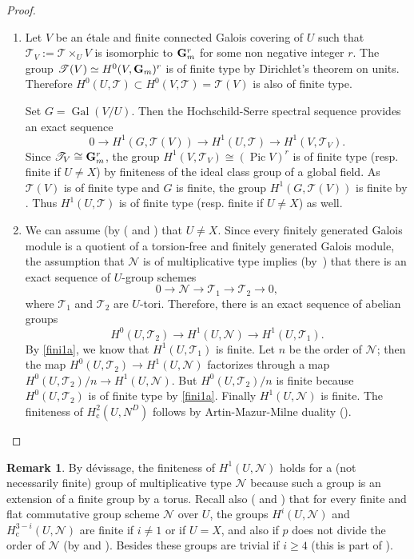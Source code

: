 \documentclass[10pt,a4paper]{amsart}
\newcommand{\resp}{resp.\xspace}
\newcommand{\skpt}{\smallskip}
\let\mathcal\mathscr
\newenvironment{enumeratea}
{\bgroup\def\theenumi{\alph{enumi}}\begin{enumerate}}
{\end{enumerate}\egroup}
\newcommand{\rc}{\mathrm{c}}
\theoremstyle{plain}
\theoremstyle{definition}
\newtheorem{rema}[theo]{Remark}
\DeclareMathOperator \pic {Pic}
\DeclareMathOperator \gal {Gal}
\newcommand\cN {\mathcal{N}}
\newcommand \cT {\mathcal{T}}
\begin{document}
\skpt\begin{proof}
\begin{enumeratea}
\item
Let $V$ be an étale and finite connected
Galois covering of $U$ such that $\cT_V:=\cT \times_U V$
is isomorphic to $\mathbf{G}_m^r$ for some non negative integer $r$.
The group $\cT(V) \simeq
H^0(V,\G)^r$ is of finite type by Dirichlet's theorem on units. Therefore
$H^0(U,\cT) \subset H^0(V,\cT)=\cT(V)$
is also of finite type.

Set $G=\gal(V/U)$. Then the Hochschild-Serre spectral sequence provides an
exact sequence
\[
0 \to H^1(G,\cT(V)) \to H^1(U,\cT)
\to H^1(V,\cT_V).
\]
Since $\cT_V \cong \G^r$, the group
$H^1(V,\cT_V) \cong (\pic V)^r$ is of finite type
(\resp finite if $U \neq X$) by finiteness of the ideal class group
of a global field.
As $\cT(V)$ is of finite type and $G$ is finite, the group
$H^1(G,\cT(V))$ is finite by \cite[Chap.\,VIII, Cor.\,2]{col}.
Thus $H^1(U,\cT)$ is of
finite type (\resp finite if $U \neq X$) as well.

\item
We can assume (by (\cite[Lem.\,III.8.9]{MilADT}
and \cite[Cor.\,4.9]{DemH}) that $U \neq X$.
Since every finitely generated Galois module is a quotient of a
torsion-free and finitely generated Galois module, the
assumption that $\cN$ is of multiplicative type implies
(by~\cite[X, Prop.\,1.1]{sga3})
that there is an exact sequence of $U$-group schemes
\[
0 \to \cN \to \cT_1 \to \cT_2 \to 0,
\]
where $\cT_1$ and $\cT_2$ are $U$-tori. Therefore, there is
an exact sequence of abelian groups
\[
H^0(U,\cT_2) \to H^1(U, \cN) \to H^1(U, \cT_1).
\]
By \eqref{fini1a}, we know that $H^1(U, \cT_1)$ is finite. Let $n$ be the order
of $\cN$; then the map $H^0(U,\cT_2) \to H^1(U, \cN)$
factorizes through a map $H^0(U,\cT_2)/n \to H^1(U, \cN)$.
But $H^0(U,\cT_2)/n$ is finite because $H^0(U,\cT_2)$
is of finite type by \eqref{fini1a}. Finally $H^1(U, \cN)$ is finite. The
finiteness of $H^2_\rc(U,N^D)$ follows by Artin-Mazur-Milne
duality (\cite[Th.\,1.1]{DemH}).\qedhere
\end{enumeratea}
\end{proof}

\begin{rema} \label{fini2}
By dévissage, the finiteness of $H^1(U, \cN)$ holds for
a (not necessarily finite)
group of multiplicative type $\cN$
because such a group is an extension of
a finite group by a torus. Recall also (\cite[Lem.\,III.8.9]{MilADT}
and \cite[Cor.\,4.8]{DemH})
that for every finite and flat commutative
group scheme $\cN$ over $U$, the groups $H^i(U,\cN)$ and
$H^{3-i}_\rc(U,\cN)$ are finite if $i \neq 1$ or if $U=X$, and
also if $p$ does not divide the order of $\cN$ (by \cite[Prop.\,2.1\,(4)]{DemH} and \cite[Th.\,II.3.1]{MilADT}).
Besides these groups are trivial if $i \geq 4$ (this is part of \cite[Th.\,1.1]{DemH}).
\end{rema}
\end{document}
